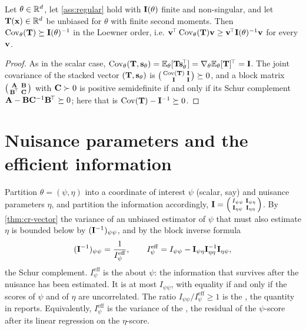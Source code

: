 \begin{theorem}
\label{thm:cr-vector}
Let $\theta\in\mathbb{R}^d$, let \cref{ass:regular} hold with $\mathbf{I}(\theta)$ finite and
non-singular, and let $\mathbf{T}(\mathbf{x})\in\mathbb{R}^d$ be unbiased for $\theta$ with finite
second moments. Then $\operatorname{Cov}_\theta(\mathbf{T})\succeq\mathbf{I}(\theta)^{-1}$ in the Loewner order,
i.e. $\mathbf{v}^{\!\top}\operatorname{Cov}_\theta(\mathbf{T})\mathbf{v}\ge\mathbf{v}^{\!\top}\mathbf{I}(\theta)^{-1}\mathbf{v}$
for every $\mathbf{v}$.
\end{theorem}
\begin{proof}
As in the scalar case, $\operatorname{Cov}_\theta(\mathbf{T},\mathbf{s}_\theta)=\mathbb{E}_\theta[\mathbf{T}\mathbf{s}_\theta^{\!\top}]=\nabla_\theta\mathbb{E}_\theta[\mathbf{T}]^{\!\top}=\mathbf{I}$.
The joint covariance of the stacked vector $(\mathbf{T},\mathbf{s}_\theta)$ is
$\begin{psmallmatrix}\operatorname{Cov}(\mathbf{T})&\mathbf{I}\\ \mathbf{I}&\mathbf{I}\end{psmallmatrix}\succeq0$, and a
block matrix $\begin{psmallmatrix}\mathbf{A}&\mathbf{B}\\ \mathbf{B}^{\!\top}&\mathbf{C}\end{psmallmatrix}$
with $\mathbf{C}\succ0$ is positive semidefinite if and only if its Schur complement
$\mathbf{A}-\mathbf{B}\mathbf{C}^{-1}\mathbf{B}^{\!\top}\succeq0$; here that is $\operatorname{Cov}(\mathbf{T})-\mathbf{I}^{-1}\succeq0$.
\end{proof}

\section{Nuisance parameters and the efficient information}
\label{sec:efficient}

Partition $\theta=(\psi,\eta)$ into a coordinate of interest $\psi$ (scalar, say) and
nuisance parameters $\eta$, and partition the information accordingly,
$\mathbf{I}=\begin{psmallmatrix}I_{\psi\psi}&\mathbf{I}_{\psi\eta}\\ \mathbf{I}_{\eta\psi}&\mathbf{I}_{\eta\eta}\end{psmallmatrix}$.
By \cref{thm:cr-vector} the variance of an unbiased estimator of $\psi$ that must
also estimate $\eta$ is bounded below by $(\mathbf{I}^{-1})_{\psi\psi}$, and by the block
inverse formula
\begin{equation}
  (\mathbf{I}^{-1})_{\psi\psi}=\frac1{I^{\mathrm{eff}}_{\psi}},\qquad
  I^{\mathrm{eff}}_{\psi}=I_{\psi\psi}-\mathbf{I}_{\psi\eta}\mathbf{I}_{\eta\eta}^{-1}\mathbf{I}_{\eta\psi},
  \label{eq:efficient}
\end{equation}
the Schur complement. $I^{\mathrm{eff}}_\psi$ is the 
about $\psi$: the information that survives after the nuisance has been estimated. It
is at most $I_{\psi\psi}$, with equality if and only if the scores of $\psi$ and of $\eta$
are uncorrelated. The ratio $I_{\psi\psi}/I^{\mathrm{eff}}_\psi\ge1$ is the
, the quantity  in
 reports. Equivalently, $I^{\mathrm{eff}}_\psi$
is the variance of the , the residual of the $\psi$-score after
its linear regression on the $\eta$-score.


